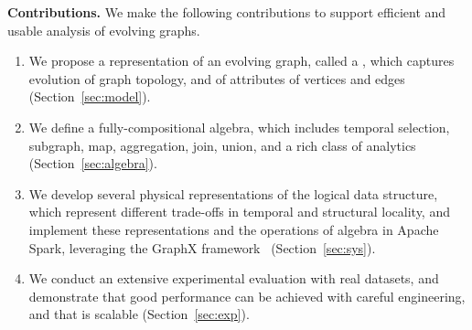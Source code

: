 {\bf Contributions.} We make the following contributions to support
efficient and usable analysis of evolving graphs.

\begin{enumerate}[noitemsep,leftmargin=*]

\item We propose a representation of an evolving graph, called a \tg,
  which captures evolution of graph topology, and of attributes of
  vertices and edges (Section~\ref{sec:model}).  

\item We define a fully-compositional \tg algebra, which includes
  temporal selection, subgraph, map, aggregation, join, union, and a
  rich class of analytics (Section~\ref{sec:algebra}).

\item We develop several physical representations of the logical \tg
  data structure, which represent different trade-offs in temporal and
  structural locality, and implement these representations and the operations of \tg algebra in Apache Spark,
  leveraging the GraphX
  framework~\cite{DBLP:conf/osdi/GonzalezXDCFS14} 
  (Section~\ref{sec:sys}).  

\item We conduct an extensive experimental evaluation with real
  datasets, and demonstrate that good performance can be achieved with
  careful engineering, and that \ql is scalable
  (Section~\ref{sec:exp}).

\end{enumerate}

